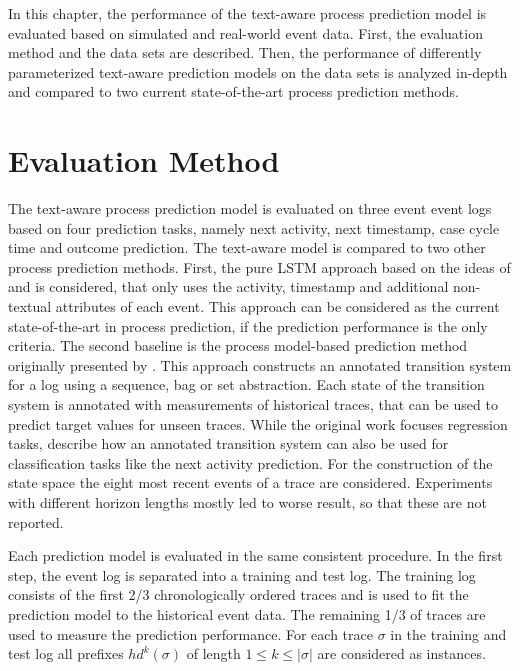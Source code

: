 In this chapter, the performance of the text-aware process prediction model is evaluated based on simulated and real-world event data.
First, the evaluation method and the data sets are described.
Then, the performance of differently parameterized text-aware prediction models on the data sets is analyzed in-depth and compared to two current state-of-the-art process prediction methods.

\section{Evaluation Method}

The text-aware process prediction model is evaluated on three event event logs based on four prediction tasks, namely next activity, next timestamp, case cycle time and outcome prediction.
The text-aware model is compared to two other process prediction methods.
First, the pure LSTM approach based on the ideas of \citeauthor{DBLP:conf/caise/TaxVRD17} \cite{DBLP:conf/caise/TaxVRD17} and \citeauthor{DBLP:conf/ssci/NavarinVPS17} \cite{DBLP:conf/ssci/NavarinVPS17} is considered, that only uses the activity, timestamp and additional non-textual attributes of each event.
This approach can be considered as the current state-of-the-art in process prediction, if the prediction performance is the only criteria.
The second baseline is the process model-based prediction method originally presented by \citeauthor{DBLP:journals/is/AalstSS11} \cite{DBLP:journals/is/AalstSS11}.
This approach constructs an annotated transition system for a log using a sequence, bag or set abstraction.
Each state of the transition system is annotated with measurements of historical traces, that can be used to predict target values for unseen traces.
While the original work focuses regression tasks, \citeauthor{DBLP:journals/sosym/TaxTZ20} \cite{DBLP:journals/sosym/TaxTZ20} describe how an annotated transition system can also be used for classification tasks like the next activity prediction.
For the construction of the state space the eight most recent events of a trace are considered.
Experiments with different horizon lengths mostly led to worse result, so that these are not reported.

Each prediction model is evaluated in the same consistent procedure.
In the first step, the event log is separated into a training and test log. 
The training log consists of the first 2/3 chronologically ordered traces and is used to fit the prediction model to the historical event data.
The remaining 1/3 of traces are used to measure the prediction performance.
For each trace $\sigma$ in the training and test log all prefixes $hd^k(\sigma)$ of length $1 \leq k \leq |\sigma|$ are considered as instances.

